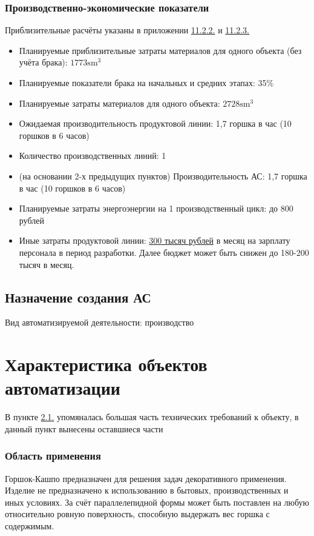 \documentclass[16pt,a4paper]{article}
\begin{document}
\subsubsection{Производственно-экономические показатели}
Приблизительные расчёты указаны в приложении \hyperref[sec:at2]{11.2.2.} и \hyperref[sec:at3]{11.2.3.}
\begin{itemize}
    \item Планируемые приблизительные затраты материалов для одного объекта (без учёта брака): $1773 \text{sm}^3$
    \item Планируемые показатели брака на начальных и средних этапах: 35\%
    \item Планируемые затраты материалов для одного объекта: $2728 \text{sm}^3$
    \item Ожидаемая производительность продуктовой линии: 1,7 горшка в час (10 горшков в 6 часов)
    \item Количество производственных линий: 1
    \item (на основании 2-х предыдущих пунктов) Производительность АС: 1,7 горшка в час (10 горшков в 6 часов)
    \item Планируемые затраты энергоэнергии на 1 производственный цикл: до 800 рублей
    \item Иные затраты продуктовой линии: \hyperref[sec:4.5.1.]{300 тысяч рублей} в месяц на зарплату персонала в период разработки. Далее бюджет может быть снижен до 180-200 тысяч в месяц.
\end{itemize}
\subsection{Назначение создания АС}
Вид автоматизируемой деятельности: производство
\section{Характеристика объектов автоматизации}
В пункте \hyperref[sec:2.1.]{2.1.} упомяналась большая часть технических требований к объекту, в данный пункт вынесены оставшиеся части
\subsubsection{Область применения}
Горшок-Кашпо предназначен для решения задач декоративного применения. Изделие не предназначено к использованию в бытовых, производственных и иных условиях. За счёт параллелепидной формы может быть поставлен на любую относительно ровную поверхность, способную выдержать вес горшка с содержимым.
\end{document}
